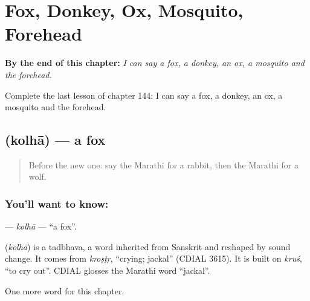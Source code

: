 
\chapter{Fox, Donkey, Ox, Mosquito, Forehead}
\label{ch:mr-fox-donkey-ox-mosquito-forehead}

\begin{chapteropening}
\textbf{By the end of this chapter:} \emph{I can say a fox, a donkey, an ox, a mosquito and the forehead.}

Complete the last lesson of chapter 144: I can say a fox, a donkey, an ox, a mosquito and the forehead.
\end{chapteropening}

\section[\texorpdfstring{\mr{कोल्हा} (kolhā)}{कोल्हा (kolhā)}]{ (kolhā) — a fox}

\label{lesson:MR-C144-kolha}



\begin{quote}
Before the new one: say the Marathi for a rabbit, then the Marathi for a wolf.
\end{quote}

\subsection*{You'll want to know: }
\textbf{} — \emph{kolhā} — \textquotedblleft{}a fox\textquotedblright{}.

\begin{cousinweb}
\textbf{} (\emph{kolhā}) is a tadbhava, a word inherited from Sanskrit and reshaped by sound change. It comes from \emph{kroṣṭṛ}, \textquotedblleft{}crying; jackal\textquotedblright{} (CDIAL 3615). It is built on \emph{kruś}, \textquotedblleft{}to cry out\textquotedblright{}. CDIAL glosses the Marathi word \textquotedblleft{}jackal\textquotedblright{}.
\end{cousinweb}

\begin{grammarlens}[title={What you've built}]
One more word for this chapter.
\end{grammarlens}

